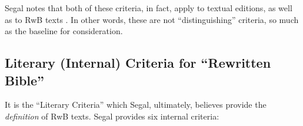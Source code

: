 Segal notes that both of these criteria, in fact, apply to textual
editions, as well as to RwB texts \autocite[20]{segal_henze2005}. In
other words, these are not ``distinguishing'' criteria, so much as the
baseline for consideration.

\subsection{\texorpdfstring{Literary (Internal) Criteria for ``Rewritten
Bible''}{Literary (Internal) Criteria for Rewritten Bible}}\label{literary-internal-criteria-for-rewritten-bible}

It is the ``Literary Criteria'' which Segal, ultimately, believes
provide the \emph{definition} of RwB
texts.\autocite[20]{segal_henze2005} Segal provides six internal
criteria:

